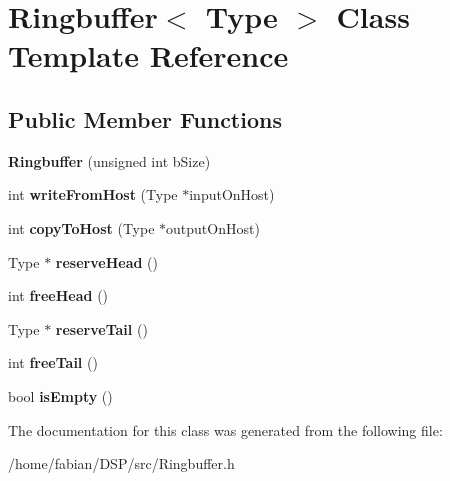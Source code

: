 \hypertarget{classRingbuffer}{\section{Ringbuffer$<$ Type $>$ Class Template Reference}
\label{classRingbuffer}
}
\subsection*{Public Member Functions}
\begin{DoxyCompactItemize}
\item 
\hypertarget{classRingbuffer_a958802766ae9d4003db4fbbb251b45a1}{{\bfseries Ringbuffer} (unsigned int b\-Size)}\label{classRingbuffer_a958802766ae9d4003db4fbbb251b45a1}

\item 
\hypertarget{classRingbuffer_ac8b2973f3ab190cf778535c394ba980d}{int {\bfseries write\-From\-Host} (Type $\ast$input\-On\-Host)}\label{classRingbuffer_ac8b2973f3ab190cf778535c394ba980d}

\item 
\hypertarget{classRingbuffer_a97f008c10065843bbab49579c8ce3ce4}{int {\bfseries copy\-To\-Host} (Type $\ast$output\-On\-Host)}\label{classRingbuffer_a97f008c10065843bbab49579c8ce3ce4}

\item 
\hypertarget{classRingbuffer_acf64a0c3c16f208dd1191130b0d18b33}{Type $\ast$ {\bfseries reserve\-Head} ()}\label{classRingbuffer_acf64a0c3c16f208dd1191130b0d18b33}

\item 
\hypertarget{classRingbuffer_a1d8b62be3d51a00930e7b06d1ad2df53}{int {\bfseries free\-Head} ()}\label{classRingbuffer_a1d8b62be3d51a00930e7b06d1ad2df53}

\item 
\hypertarget{classRingbuffer_a3aadf9953f637b327125d96fa6d2c65c}{Type $\ast$ {\bfseries reserve\-Tail} ()}\label{classRingbuffer_a3aadf9953f637b327125d96fa6d2c65c}

\item 
\hypertarget{classRingbuffer_a66193754bca336ed8b8f2d5a9a89995c}{int {\bfseries free\-Tail} ()}\label{classRingbuffer_a66193754bca336ed8b8f2d5a9a89995c}

\item 
\hypertarget{classRingbuffer_af746d95cfff3115957d01181484be191}{bool {\bfseries is\-Empty} ()}\label{classRingbuffer_af746d95cfff3115957d01181484be191}

\end{DoxyCompactItemize}


The documentation for this class was generated from the following file\-:\begin{DoxyCompactItemize}
\item 
/home/fabian/\-D\-S\-P/src/Ringbuffer.\-h\end{DoxyCompactItemize}

